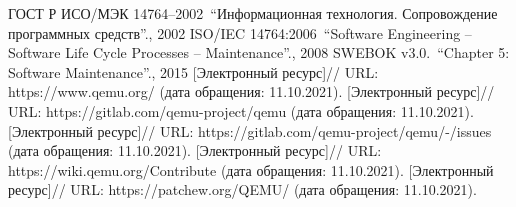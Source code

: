 
\pagebreak
\begin{thebibliography}{1}
     ГОСТ Р ИСО/МЭК 14764--2002\ \enquote{Информационная технология. Сопровождение программных средств}., 2002
     ISO/IEC 14764:2006\ \enquote{Software Engineering -- Software Life Cycle Processes -- Maintenance}., 2008
     SWEBOK v3.0.\ \enquote{Chapter 5: Software Maintenance}., 2015
     [Электронный ресурс]// URL: https://www.qemu.org/ (дата обращения: 11.10.2021).
     [Электронный ресурс]// URL: https://gitlab.com/qemu-project/qemu (дата обращения: 11.10.2021).
     [Электронный ресурс]// URL: https://gitlab.com/qemu-project/qemu/-/issues (дата обращения: 11.10.2021).
     [Электронный ресурс]// URL: https://wiki.qemu.org/Contribute (дата обращения: 11.10.2021).
     [Электронный ресурс]// URL: https://patchew.org/QEMU/ (дата обращения: 11.10.2021).
\end{thebibliography}
